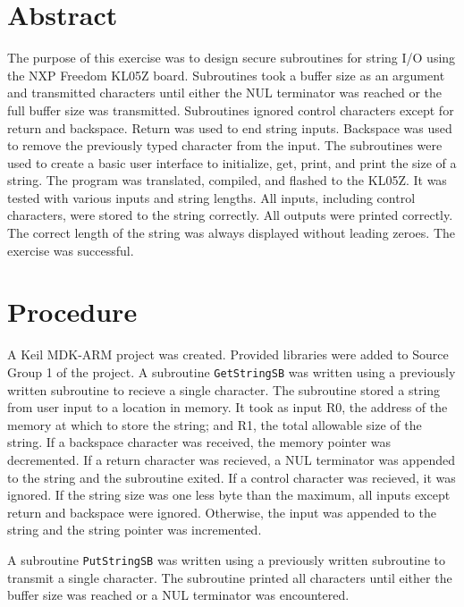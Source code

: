 \documentclass[CMPE]{KGCOEReport}
\begin{document}
\maketitle

\section*{Abstract}

The purpose of this exercise was to design secure subroutines for string I/O
using the NXP Freedom KL05Z board. Subroutines took a buffer size as an
argument and transmitted characters until either the NUL terminator was reached
or the full buffer size was transmitted. Subroutines ignored control characters
except for return and backspace. Return was used to end string inputs.
Backspace was used to remove the previously typed character from the input. The
subroutines were used to create a basic user interface to initialize, get,
print, and print the size of a string. The program was translated, compiled,
and flashed to the KL05Z. It was tested with various inputs and string lengths.
All inputs, including control characters, were stored to the string correctly.
All outputs were printed correctly. The correct length of the string was always
displayed without leading zeroes. The exercise was successful.

\section*{Procedure}

A Keil MDK-ARM project was created. Provided libraries were added to Source
Group 1 of the project. A subroutine \texttt{GetStringSB} was written using
a previously written subroutine to recieve a single character. The subroutine
stored a string from user input to a location in memory. It took as input R0,
the address of the memory at which to store the string; and R1, the total
allowable size of the string. If a backspace character was received, the memory
pointer was decremented. If a return character was recieved, a NUL terminator
was appended to the string and the subroutine exited. If a control character
was recieved, it was ignored. If the string size was one less byte than the
maximum, all inputs except return and backspace were ignored. Otherwise, the
input was appended to the string and the string pointer was incremented.

A subroutine \texttt{PutStringSB} was written using a previously written
subroutine to transmit a single character. The subroutine printed all
characters until either the buffer size was reached or a NUL terminator was
encountered.
\end{document}
